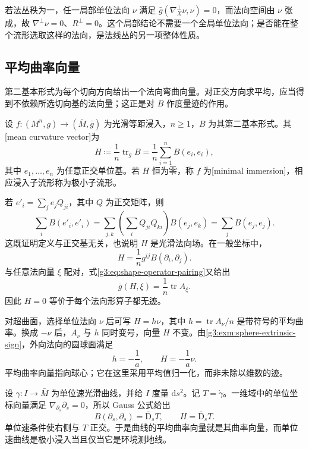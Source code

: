 若法丛秩为一，任一局部单位法向 \(\nu\) 满足
\(\bar g(\nabla^\perp_X\nu,\nu)=0\)，而法向空间由 \(\nu\) 张成，故 \(\nabla^\perp\nu=0\)、\(R^\perp=0\)。这个局部结论不需要一个全局单位法向；是否能在整个流形选取这样的法向，是法线丛的另一项整体性质。

\subsection{平均曲率向量}
\label{g3:subsec:0401:03}

第二基本形式为每个切向方向给出一个法向弯曲向量。对正交方向求平均，应当得到不依赖所选切向基的法向量；这正是对 \(B\) 作度量迹的作用。

\begin{definition}\label{g3:def:mean-curvature-vector}
	设 \(f:(M^n,g)\to(\bar M,\bar g)\) 为光滑等距浸入，\(n\ge1\)，\(B\) 为其第二基本形式。其[mean curvature vector]为
	\begin{equation}\label{g3:eq:mean-curvature-vector}
		H\coloneqq\frac1n\operatorname{tr}_gB
			=\frac1n\sum_{i=1}^nB(e_i,e_i),
	\end{equation}
	其中 \(e_1,\ldots,e_n\) 为任意正交单位基。若 \(H\) 恒为零，称 \(f\) 为[minimal immersion]，相应浸入子流形称为极小子流形。
\end{definition}

若 \(e'_i=\sum_j e_jQ_{ji}\)，其中 \(Q\) 为正交矩阵，则
\[
	\sum_iB(e'_i,e'_i)
	=\sum_{j,k}\left(\sum_iQ_{ji}Q_{ki}\right)B(e_j,e_k)
	=\sum_jB(e_j,e_j).
\]
这既证明定义与正交基无关，也说明 \(H\) 是光滑法向场。在一般坐标中，
\[
	H=\frac1n g^{ij}B(\partial_i,\partial_j).
\]
与任意法向量 \(\xi\) 配对，式\eqref{g3:eq:shape-operator-pairing}又给出
\begin{equation}\label{g3:eq:mean-curvature-shape-trace}
	\bar g(H,\xi)=\frac1n\operatorname{tr}A_\xi.
\end{equation}
因此 \(H=0\) 等价于每个法向形算子都无迹。

\ProseParagraphBreak

对超曲面，选择单位法向 \(\nu\) 后可写 \(H=h\nu\)，其中 \(h=\operatorname{tr}A_\nu/n\) 是带符号的平均曲率。换成 \(-\nu\) 后，\(A_\nu\) 与 \(h\) 同时变号，向量 \(H\) 不变。由\cref{g3:exm:sphere-extrinsic-sign}，外向法向的圆球面满足
\[
	h=-\frac1a,\qquad H=-\frac1a\nu.
\]
平均曲率向量指向球心；它在这里采用平均值归一化，而非未除以维数的迹。

\begin{example}\label{g3:exm:curve-mean-curvature-vector}
	设 \(\gamma:I\to\bar M\) 为单位速光滑曲线，并给 \(I\) 度量 \(\mathrm ds^2\)。记 \(T=\dot\gamma\)。一维域中的单位坐标向量满足 \(\nabla_{\partial_s}\partial_s=0\)，所以 Gauss 公式给出
	\[
		B(\partial_s,\partial_s)=\bar{\mathrm D}_sT,\qquad
		H=\bar{\mathrm D}_sT.
	\]
	单位速条件使右侧与 \(T\) 正交。于是曲线的平均曲率向量就是其曲率向量，而单位速曲线是极小浸入当且仅当它是环境测地线。
\end{example}

